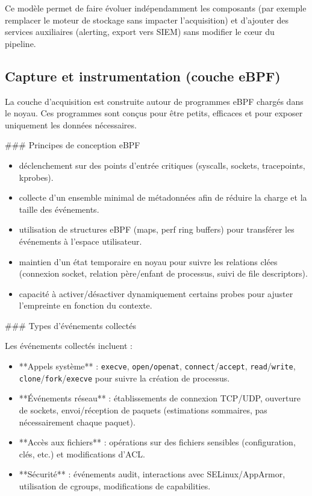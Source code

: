 \documentclass[a4paper,12pt]{article}
\begin{document}
Ce modèle permet de faire évoluer indépendamment les composants (par exemple remplacer le moteur de stockage sans impacter l'acquisition) et d'ajouter des services auxiliaires (alerting, export vers SIEM) sans modifier le cœur du pipeline.

\subsection{Capture et instrumentation (couche eBPF)}

La couche d'acquisition est construite autour de programmes eBPF chargés dans le noyau. Ces programmes sont conçus pour être petits, efficaces et pour exposer uniquement les données nécessaires.

### Principes de conception eBPF

\begin{itemize}
  \item déclenchement sur des points d'entrée critiques (syscalls, sockets, tracepoints, kprobes). 
  \item collecte d'un ensemble minimal de métadonnées afin de réduire la charge et la taille des événements.
  \item utilisation de structures eBPF (maps, perf ring buffers) pour transférer les événements à l'espace utilisateur.
  \item maintien d'un état temporaire en noyau pour suivre les relations clées (connexion socket, relation père/enfant de processus, suivi de file descriptors).
  \item capacité à activer/désactiver dynamiquement certains probes pour ajuster l'empreinte en fonction du contexte.
\end{itemize}

### Types d'événements collectés

Les événements collectés incluent :

\begin{itemize}
  \item **Appels système** : \texttt{execve}, \texttt{open/openat}, \texttt{connect}/\texttt{accept}, \texttt{read}/\texttt{write}, \texttt{clone}/\texttt{fork}/\texttt{execve} pour suivre la création de processus.
  \item **Événements réseau** : établissements de connexion TCP/UDP, ouverture de sockets, envoi/réception de paquets (estimations sommaires, pas nécessairement chaque paquet).
  \item **Accès aux fichiers** : opérations sur des fichiers sensibles (configuration, clés, etc.) et modifications d'ACL.
  \item **Sécurité** : événements audit, interactions avec SELinux/AppArmor, utilisation de cgroups, modifications de capabilities.
\end{itemize}
\end{document}
